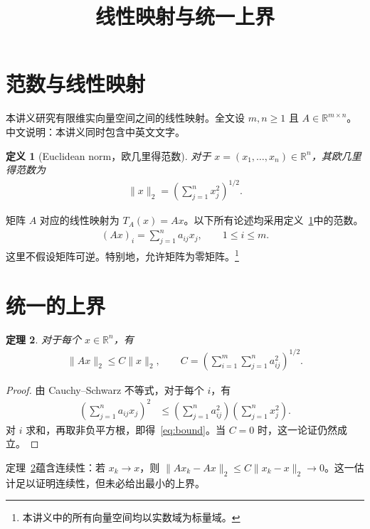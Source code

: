 \documentclass[UTF8,12pt,fontset=fandol]{ctexart}
\title{线性映射与统一上界}
\author{}
\date{}
\newcommand{\R}{\mathbb{R}}
\newtheorem{definition}{定义}[section]
\newtheorem{theorem}[definition]{定理}
\begin{document}
\maketitle
\section{范数与线性映射}
本讲义研究有限维实向量空间之间的线性映射。全文设 $m,n\geq1$ 且 $A\in\R^{m\times n}$。中文说明：本讲义同时包含中英文文字。
\begin{definition}[Euclidean norm，欧几里得范数]\label{def:norm}
对于 $x=(x_1,\ldots,x_n)\in\R^n$，其欧几里得范数为
\begin{align}\label{eq:norm}
\|x\|_2=\left(\sum_{j=1}^n x_j^2\right)^{1/2}.
\end{align}
\end{definition}
矩阵 $A$ 对应的线性映射为 $T_A(x)=Ax$。以下所有论述均采用定义~\ref{def:norm}中的范数。
\begin{align}\label{eq:product}
(Ax)_i=\sum_{j=1}^n a_{ij}x_j,\qquad 1\leq i\leq m.
\end{align}
这里不假设矩阵可逆。特别地，允许矩阵为零矩阵。\footnote{本讲义中的所有向量空间均以实数域为标量域。}

\newpage
\section{统一的上界}
\begin{theorem}\label{thm:bound}
对于每个 $x\in\R^n$，有
\begin{align}\label{eq:bound}
\|Ax\|_2\leq C\|x\|_2,\qquad C=\left(\sum_{i=1}^m\sum_{j=1}^n a_{ij}^2\right)^{1/2}.
\end{align}
\end{theorem}
\begin{proof}
由 Cauchy--Schwarz 不等式，对于每个 $i$，有
\begin{align*}
\left(\sum_{j=1}^n a_{ij}x_j\right)^2
&\leq\left(\sum_{j=1}^n a_{ij}^2\right)\left(\sum_{j=1}^n x_j^2\right).
\end{align*}
对 $i$ 求和，再取非负平方根，即得~\eqref{eq:bound}。当 $C=0$ 时，这一论证仍然成立。
\end{proof}
定理~\ref{thm:bound}蕴含连续性：若 $x_k\to x$，则 $\|Ax_k-Ax\|_2\leq C\|x_k-x\|_2\to0$。这一估计足以证明连续性，但未必给出最小的上界。

\newpage
\end{document}
